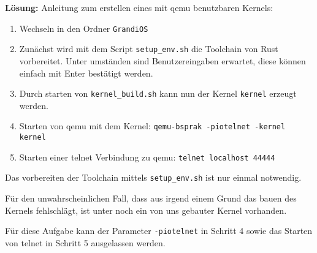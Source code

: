 \begin{description}
\textbf{Lösung:}
Anleitung zum erstellen eines mit qemu benutzbaren Kernels:
\begin{enumerate}
	\item Wechseln in den Ordner \texttt{GrandiOS}
	\item Zunächst wird mit dem Script \texttt{setup\_env.sh} die Toolchain von Rust vorbereitet. Unter umständen sind Benutzereingaben erwartet, diese können einfach mit Enter bestätigt werden.
	\item Durch starten von \texttt{kernel\_build.sh} kann nun der Kernel \texttt{kernel} erzeugt werden.
	\item Starten von qemu mit dem Kernel: \texttt{qemu-bsprak -piotelnet -kernel kernel}
	\item Starten einer telnet Verbindung zu qemu: \texttt{telnet localhost 44444}
\end{enumerate}
Das vorbereiten der Toolchain mittels \texttt{setup\_env.sh} ist nur einmal notwendig.

Für den unwahrscheinlichen Fall, dass aus irgend einem Grund das bauen des Kernels fehlschlägt, ist unter  noch ein von uns gebauter Kernel vorhanden.

Für diese Aufgabe kann der Parameter \texttt{-piotelnet} in Schritt 4 sowie das Starten von telnet in Schritt 5 ausgelassen werden.


\end{description}
